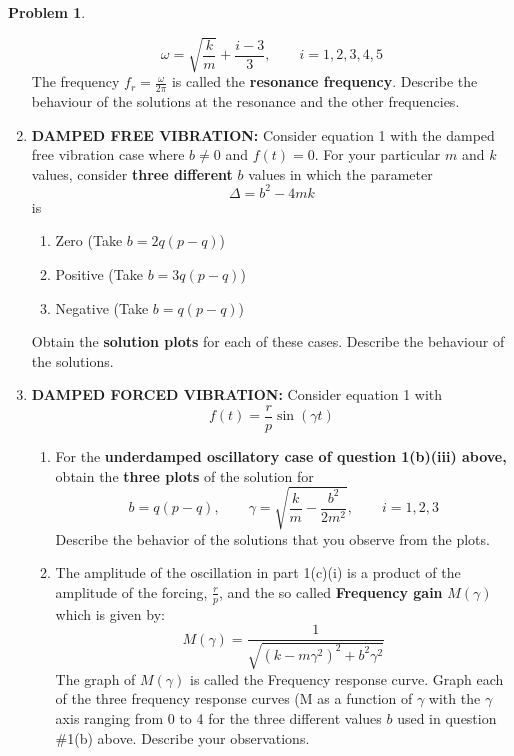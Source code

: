 \documentclass[10pt]{article}
\theoremstyle{definition}
\newtheorem{problem}{Problem}
\begin{document}
\begin{problem}
\begin{enumerate}[label=(\alph*)]
        \begin{equation}
          \omega=\sqrt{\frac{k}{m}}+\frac{i-3}{3},\qquad i=1,2,3,4,5
        \end{equation}
        The frequency $f_r=\frac{\omega}{2\pi}$ is called the \textbf{resonance frequency}. Describe the behaviour of the solutions
        at the resonance and the other frequencies.
  \item \textbf{DAMPED FREE VIBRATION:} Consider equation 1 with the damped free vibration case where $b \neq 0$ and $f (t) = 0$.
        For your particular $m$ and $k$ values, consider \textbf{three different} $b$ values in which the parameter
        \begin{equation}
          \Delta=b^2-4mk
        \end{equation}
        is
        \begin{enumerate}[label=\roman*.]
          \item Zero (Take $b=2q\left(p-q\right)$)
          \item Positive (Take $b=3q\left(p-q\right)$)
          \item Negative (Take $b=q\left(p-q\right)$)
        \end{enumerate}
        Obtain the \textbf{solution plots} for each of these cases. Describe the behaviour of the solutions.
  \item \textbf{DAMPED FORCED VIBRATION:} Consider equation 1 with
        \begin{equation}
          f(t)=\frac{r}{p}\sin\left(\gamma t\right)
        \end{equation}
        \begin{enumerate}[label=\roman*.]
          \item For the \textbf{underdamped oscillatory case of question 1(b)(iii) above,} obtain
                the \textbf{three plots} of the solution for
                \begin{equation}
                  b=q\left(p-q\right), \qquad \gamma=\sqrt{\frac{k}{m}-\frac{b^2}{2m^2}}, \qquad i=1,2,3
                \end{equation}
                Describe the behavior of the solutions that you observe from the plots.
          \item The amplitude of the oscillation in part 1(c)(i) is a product of the amplitude of the forcing, $\frac{r}{p}$, and the so called \textbf{Frequency gain} $M\left(\gamma\right)$ which is given by:
                \begin{equation}
                  M\left(\gamma\right)=\frac{1}{\sqrt{\left(k-m\gamma^2\right)^2+b^2\gamma^2}}
                \end{equation}
                The graph of $M\left(\gamma\right)$ is called the Frequency response curve. Graph each of the three frequency response curves
                (M as a function of $\gamma$ with the $\gamma$ axis ranging from 0 to 4 for the three different values $b$ used in question \#1(b) above. Describe your observations.
        \end{enumerate}
\end{enumerate}
\end{problem}
\newpage
\end{document}
